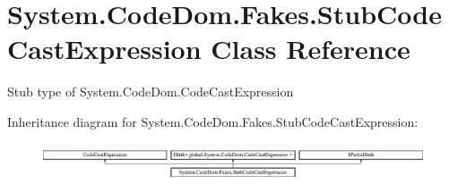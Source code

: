 \hypertarget{class_system_1_1_code_dom_1_1_fakes_1_1_stub_code_cast_expression}{\section{System.\-Code\-Dom.\-Fakes.\-Stub\-Code\-Cast\-Expression Class Reference}
\label{class_system_1_1_code_dom_1_1_fakes_1_1_stub_code_cast_expression}
}


Stub type of System.\-Code\-Dom.\-Code\-Cast\-Expression 


Inheritance diagram for System.\-Code\-Dom.\-Fakes.\-Stub\-Code\-Cast\-Expression\-:\begin{figure}[H]
\begin{center}
\leavevmode
\includegraphics[height=1.131313cm]{class_system_1_1_code_dom_1_1_fakes_1_1_stub_code_cast_expression}
\end{center}
\end{figure}
